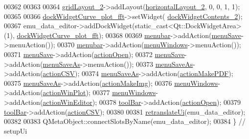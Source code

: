 \begin{DoxyCode}
00362 
00363 
00364         \hyperlink{a00026_ab6610272c6c39cba66cab113d98dcdcd}{gridLayout\_2}->addLayout(\hyperlink{a00026_aaee23fa38e3335cc652ebd35fcdbafc8}{horizontalLayout\_2}, 0, 0, 1, 1);
00365 
00366         \hyperlink{a00026_a7474d72172d9e269e8f3cb22bbe2fc86}{dockWidgetCurve\_plot\_fft}->setWidget(
      \hyperlink{a00026_ae304b249d83cb3152fbbf7a7d7e0e29b}{dockWidgetContents\_2});
00367         emu\_data\_editor->addDockWidget(static\_cast<Qt::DockWidgetArea>(1), 
      \hyperlink{a00026_a7474d72172d9e269e8f3cb22bbe2fc86}{dockWidgetCurve\_plot\_fft});
00368 
00369         \hyperlink{a00026_af09fe2fe1f34525f5caeb5ada7d297bf}{menubar}->addAction(\hyperlink{a00026_a36a184d4c55f5de1b542257cbe23adaf}{menuSave}->menuAction());
00370         \hyperlink{a00026_af09fe2fe1f34525f5caeb5ada7d297bf}{menubar}->addAction(\hyperlink{a00026_a0c7cba2d30d21689f48f1981e976c0b6}{menuWindows}->menuAction());
00371         \hyperlink{a00026_a36a184d4c55f5de1b542257cbe23adaf}{menuSave}->addAction(\hyperlink{a00026_a3ceb57268680eb23f6a3d522b303bb43}{actionOpen});
00372         \hyperlink{a00026_a36a184d4c55f5de1b542257cbe23adaf}{menuSave}->addAction(\hyperlink{a00026_a2568794cbc6cc9907104efbfd79eba7d}{menuSaveAs}->menuAction());
00373         \hyperlink{a00026_a2568794cbc6cc9907104efbfd79eba7d}{menuSaveAs}->addAction(\hyperlink{a00026_afae3d61aac77b6c20a7953b3adba9672}{actionCSV});
00374         \hyperlink{a00026_a2568794cbc6cc9907104efbfd79eba7d}{menuSaveAs}->addAction(\hyperlink{a00026_af013c084ff0ed9ae39a60aa7a39bdd91}{actionMakePDF});
00375         \hyperlink{a00026_a2568794cbc6cc9907104efbfd79eba7d}{menuSaveAs}->addAction(\hyperlink{a00026_a345313e538e5ef49cd27c1fc0bdd4173}{actionMakeImg});
00376         \hyperlink{a00026_a0c7cba2d30d21689f48f1981e976c0b6}{menuWindows}->addAction(\hyperlink{a00026_a0aeb289d8df9db6f4329e9000e44d511}{actionWinPlot});
00377         \hyperlink{a00026_a0c7cba2d30d21689f48f1981e976c0b6}{menuWindows}->addAction(\hyperlink{a00026_aa5d56420958ab4fd1239e29714d75e18}{actionWinEditor});
00378         \hyperlink{a00026_a884ecf47fc47f20bd60e9406b1ef88f1}{toolBar}->addAction(\hyperlink{a00026_a3ceb57268680eb23f6a3d522b303bb43}{actionOpen});
00379         \hyperlink{a00026_a884ecf47fc47f20bd60e9406b1ef88f1}{toolBar}->addAction(\hyperlink{a00026_afae3d61aac77b6c20a7953b3adba9672}{actionCSV});
00380 
00381         \hyperlink{a00026_a4118bb421fd84731231aa1429fedf5f8}{retranslateUi}(emu\_data\_editor);
00382 
00383         QMetaObject::connectSlotsByName(emu\_data\_editor);
00384     \} \textcolor{comment}{// setupUi}
\end{DoxyCode}


